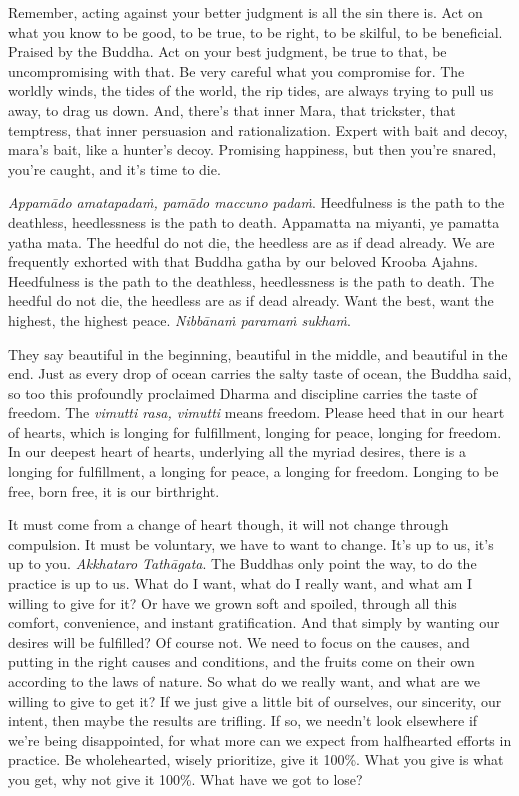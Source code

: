 \documentclass[12pt,openany]{book}
\begin{document}
Remember, acting against your better judgment is all the sin there is. Act on what you know to be good, to be true, to be right, to be skilful, to be beneficial. Praised by the Buddha. Act on your best judgment, be true to that, be uncompromising with that. Be very careful what you compromise for. The worldly winds, the tides of the world, the rip tides, are always trying to pull us away, to drag us down. And, there's that inner Mara, that trickster, that temptress, that inner persuasion and rationalization. Expert with bait and decoy, mara’s bait, like a hunter's decoy. Promising happiness, but then you're snared, you're caught, and it's time to die. 

\textit{Appamādo amatapadaṁ, pamādo maccuno padaṁ}. Heedfulness is \linebreak the path to the deathless, heedlessness is the path to death. Appamatta na miyanti, ye pamatta yatha mata. The heedful do not die, the heedless are as if dead already. We are frequently exhorted with that Buddha gatha by our beloved Krooba Ajahns. Heedfulness is the path to the deathless, heedlessness is the path to death. The heedful do not die, the heedless are as if dead already. Want the best, want the highest, the highest peace. \textit{Nibbānaṁ paramaṁ sukhaṁ}.

They say beautiful in the beginning, beautiful in the middle, and beautiful in the end. Just as every drop of ocean carries the salty taste of ocean, the Buddha said, so too this pro\-found\-ly proclaimed Dhar\-ma and discipline carries the taste of freedom. The \textit{vi\-mut\-ti ra\-sa, vi\-mut\-ti} means freedom. Please heed that in our heart of hearts, which is longing for fulfillment, longing for peace, longing for freedom. In our deepest heart of hearts, underlying all the myriad desires, there is a longing for fulfillment, a longing for peace, a longing for freedom. Longing to be free, born free, it is our birthright.

It must come from a change of heart though, it will not change through compulsion. It must be voluntary, we have to want to change. It’s up to us, it's up to you. \textit{Akkhataro Tathāgata}. The Buddhas only point the way, to do the practice is up to us. What do I want, what do I really want, and what am I willing to give for it? Or have we grown soft and spoiled, through all this comfort, convenience, and instant gratification. And that simply by wanting our desires will be fulfilled? Of course not. We need to focus on the causes, and putting in the right causes and conditions, and the fruits come on their own according to the laws of nature. So what do we really want, and what are we willing to give to get it? If we just give a little bit of ourselves, our sincerity, our intent, then maybe the results are trifling. If so, we needn't look elsewhere if we're being disappointed, for what more can we expect from halfhearted efforts in practice. Be wholehearted, wisely prioritize, give it 100\%. What you give is what you get, why not give it 100\%. What have we got to lose?
\end{document}
